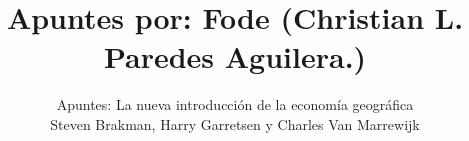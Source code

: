 \normalfont

\author{\Large Apuntes: La nueva introducción de la economía geográfica  \\ \small Steven Brakman, Harry Garretsen y Charles Van Marrewijk}
\title{\small Apuntes por: Fode (Christian L. Paredes Aguilera.)}
\date{}
\pagestyle{empty}
\maketitle
\thispagestyle{empty}
\let\cleardoublepage\clearpage
\tableofcontents								%


 
\let\cleardoublepage\clearpage
